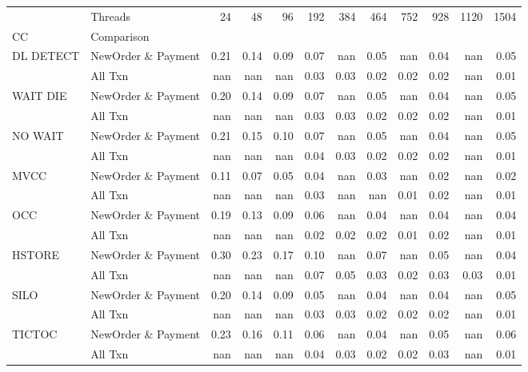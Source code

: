 \begin{tabular}{llrrrrrrrrrr}
\toprule
       & Threads &  24   &  48   &  96   &  192  &  384  &  464  &  752  &  928  &  1120 &  1504 \\
CC & Comparison &       &       &       &       &       &       &       &       &       &       \\
\midrule
DL DETECT & NewOrder \& Payment &  0.21 &  0.14 &  0.09 &  0.07 &   nan &  0.05 &   nan &  0.04 &   nan &  0.05 \\
       & All Txn &   nan &   nan &   nan &  0.03 &  0.03 &  0.02 &  0.02 &  0.02 &   nan &  0.01 \\
WAIT DIE & NewOrder \& Payment &  0.20 &  0.14 &  0.09 &  0.07 &   nan &  0.05 &   nan &  0.04 &   nan &  0.05 \\
       & All Txn &   nan &   nan &   nan &  0.03 &  0.03 &  0.02 &  0.02 &  0.02 &   nan &  0.01 \\
NO WAIT & NewOrder \& Payment &  0.21 &  0.15 &  0.10 &  0.07 &   nan &  0.05 &   nan &  0.04 &   nan &  0.05 \\
       & All Txn &   nan &   nan &   nan &  0.04 &  0.03 &  0.02 &  0.02 &  0.02 &   nan &  0.01 \\
MVCC & NewOrder \& Payment &  0.11 &  0.07 &  0.05 &  0.04 &   nan &  0.03 &   nan &  0.02 &   nan &  0.02 \\
       & All Txn &   nan &   nan &   nan &  0.03 &   nan &   nan &  0.01 &  0.02 &   nan &  0.01 \\
OCC & NewOrder \& Payment &  0.19 &  0.13 &  0.09 &  0.06 &   nan &  0.04 &   nan &  0.04 &   nan &  0.04 \\
       & All Txn &   nan &   nan &   nan &  0.02 &  0.02 &  0.02 &  0.01 &  0.02 &   nan &  0.01 \\
HSTORE & NewOrder \& Payment &  0.30 &  0.23 &  0.17 &  0.10 &   nan &  0.07 &   nan &  0.05 &   nan &  0.04 \\
       & All Txn &   nan &   nan &   nan &  0.07 &  0.05 &  0.03 &  0.02 &  0.03 &  0.03 &  0.01 \\
SILO & NewOrder \& Payment &  0.20 &  0.14 &  0.09 &  0.05 &   nan &  0.04 &   nan &  0.04 &   nan &  0.05 \\
       & All Txn &   nan &   nan &   nan &  0.03 &  0.03 &  0.02 &  0.02 &  0.02 &   nan &  0.01 \\
TICTOC & NewOrder \& Payment &  0.23 &  0.16 &  0.11 &  0.06 &   nan &  0.04 &   nan &  0.05 &   nan &  0.06 \\
       & All Txn &   nan &   nan &   nan &  0.04 &  0.03 &  0.02 &  0.02 &  0.03 &   nan &  0.01 \\
\bottomrule
\end{tabular}
